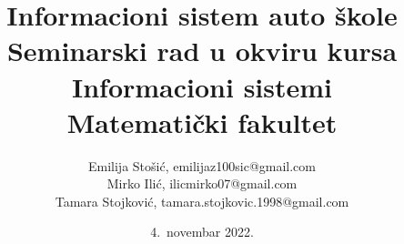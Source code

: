 \title{Informacioni sistem auto škole\\ \small{Seminarski rad u okviru kursa\\Informacioni sistemi\\ Matematički fakultet}}

\author{Emilija Stošić, emilijaz100sic@gmail.com \\ Mirko Ilić, ilicmirko07@gmail.com \\ Tamara Stojković, tamara.stojkovic.1998@gmail.com}

\date{4.~novembar 2022.}
